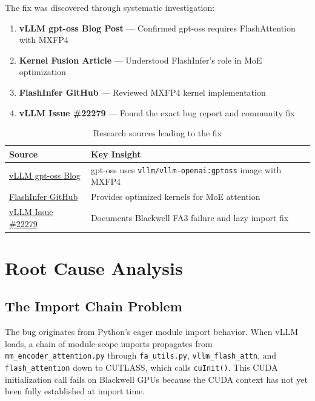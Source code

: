 \documentclass[10pt,letterpaper]{article}
\begin{document}
The fix was discovered through systematic investigation:

\begin{enumerate}[noitemsep]
    \item \textbf{vLLM gpt-oss Blog Post} \cite{vllm-gptoss} --- Confirmed gpt-oss requires FlashAttention with MXFP4 \cite{mxfp4-paper}
    \item \textbf{Kernel Fusion Article} --- Understood FlashInfer's role in MoE optimization
    \item \textbf{FlashInfer GitHub} \cite{flashinfer} --- Reviewed MXFP4 kernel implementation
    \item \textbf{vLLM Issue \#22279} \cite{vllm-blackwell-issue} --- Found the exact bug report and community fix
\end{enumerate}

\begin{table}[H]
\centering
\small
\begin{tabular}{@{}lp{8cm}@{}}
\toprule
\textbf{Source} & \textbf{Key Insight} \\
\midrule
\href{https://blog.vllm.ai/2025/08/05/gpt-oss.html}{vLLM gpt-oss Blog} & gpt-oss uses \texttt{vllm/vllm-openai:gptoss} image with MXFP4 \\
\href{https://github.com/flashinfer-ai/flashinfer}{FlashInfer GitHub} & Provides optimized kernels for MoE attention \\
\href{https://github.com/vllm-project/vllm/issues/22279}{vLLM Issue \#22279} & Documents Blackwell FA3 failure and lazy import fix \\
\bottomrule
\end{tabular}
\caption{Research sources leading to the fix}
\end{table}

\section{Root Cause Analysis}

\subsection{The Import Chain Problem}

The bug originates from Python's eager module import behavior. When vLLM loads, a chain of module-scope imports propagates from \texttt{mm\_encoder\_attention.py} through \texttt{fa\_utils.py}, \texttt{vllm\_flash\_attn}, and \texttt{flash\_attention} down to CUTLASS, which calls \texttt{cuInit()}. This CUDA initialization call fails on Blackwell GPUs because the CUDA context has not yet been fully established at import time.
\end{document}
